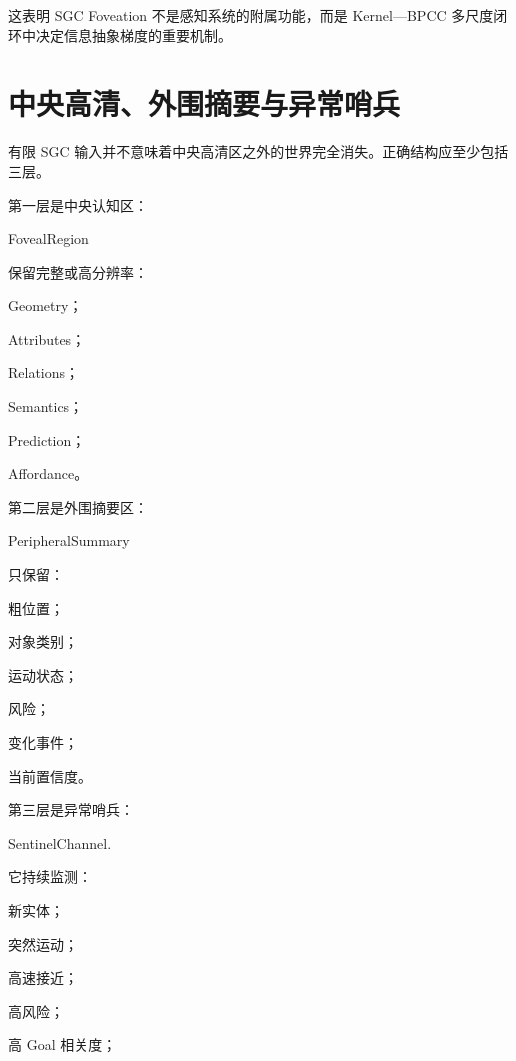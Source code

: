 \begin{statementbox}
\centering
{}
\end{statementbox}

这表明 SGC Foveation 不是感知系统的附属功能，而是 Kernel—BPCC 多尺度闭环中决定信息抽象梯度的重要机制。

\section{中央高清、外围摘要与异常哨兵}

有限 SGC 输入并不意味着中央高清区之外的世界完全消失。正确结构应至少包括三层。

第一层是中央认知区：

\begin{statementbox}
FovealRegion
\end{statementbox}

保留完整或高分辨率：

Geometry；

Attributes；

Relations；

Semantics；

Prediction；

Affordance。

第二层是外围摘要区：

\begin{statementbox}
PeripheralSummary
\end{statementbox}

只保留：

粗位置；

对象类别；

运动状态；

风险；

变化事件；

当前置信度。

第三层是异常哨兵：

\begin{statementbox}
SentinelChannel.
\end{statementbox}

它持续监测：

新实体；

突然运动；

高速接近；

高风险；

高 Goal 相关度；

